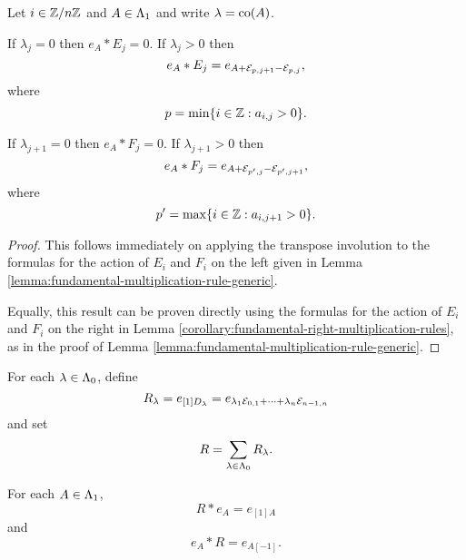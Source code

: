 \documentclass[a4paper, 11pt, twoside]{report}
\begin{document}
\begin{lemma}\label{lemma:multiplication-rule-generic-right}
Let $i\in\mathbb{Z}/{n \mathbb{Z}}$ and $A\in\Lambda_1{}$ and write $\lambda=\operatorname{co}(A)$.

If $\lambda_j=0$ then $e_A\ast E_j=0$. If $\lambda_j>0$ then
\begin{equation*}
e_A\ast E_j =e_{A+\mathcal{E}_{p,j+1}-\mathcal{E}_{p,j}},
\end{equation*}
where
\begin{equation*}
p=\min\{i\in\mathbb{Z}:a_{i,j}>0\}.
\end{equation*}

If $\lambda_{j+1}=0$ then $e_A\ast F_j=0$. If $\lambda_{j+1}>0$ then
\begin{equation*}
e_A\ast F_j = e_{A+\mathcal{E}_{p',j}-\mathcal{E}_{p',j+1}},
\end{equation*}
where
\begin{equation*}
p'=\max\{i\in\mathbb{Z}:a_{i,j+1}>0\}.
\end{equation*}
\end{lemma}

\begin{proof}
This follows immediately on applying the transpose involution to the formulas for the action of $E_i$ and $F_i$ on the left given in Lemma \ref{lemma:fundamental-multiplication-rule-generic}.

Equally, this result can be proven directly using the formulas for the action of $E_i$ and $F_i$ on the right in Lemma \ref{corollary:fundamental-right-multiplication-rules}, as in the proof of Lemma \ref{lemma:fundamental-multiplication-rule-generic}.
\end{proof}

For each $\lambda\in\Lambda_0{}$, define
\begin{equation*}
R_\lambda = e_{[1]D_{\lambda}} = e_{\lambda_1\mathcal{E}_{0,1} + \cdots + \lambda_n\mathcal{E}_{n-1,n}}
\end{equation*}
and set
\begin{equation*}
R=\sum_{\lambda\in\Lambda_0{}} R_\lambda.
\end{equation*}

\begin{lemma}\label{lemma:action-of-R-generic}
For each $A\in\Lambda_1{}$,
\begin{equation*}
R\ast e_A = e_{[1]A}
\end{equation*}
and
\begin{equation*}
e_A\ast R = e_{A[-1]}.
\end{equation*}
\end{lemma}
\end{document}
